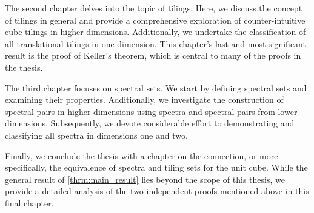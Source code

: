 \documentclass[../thesis.tex]{subfiles}
\begin{document}
The second chapter delves into the topic of tilings. Here, we discuss the concept of tilings in general and provide a comprehensive exploration of counter-intuitive cube-tilings in higher dimensions. Additionally, we undertake the classification of all translational tilings in one dimension. This chapter's last and most significant result is the proof of Keller's theorem, which is central to many of the proofs in the thesis.

The third chapter focuses on spectral sets. We start by defining spectral sets and examining their properties. Additionally, we investigate the construction of spectral pairs in higher dimensions using spectra and spectral pairs from lower dimensions. Subsequently, we devote considerable effort to demonstrating and classifying all spectra in dimensions one and two.

Finally, we conclude the thesis with a chapter on the connection, or more specifically, the equivalence of spectra and tiling sets for the unit cube. While the general result of \cref{thrm:main_result} lies beyond the scope of this thesis, we provide a detailed analysis of the two independent proofs mentioned above in this final chapter.



\end{document}
